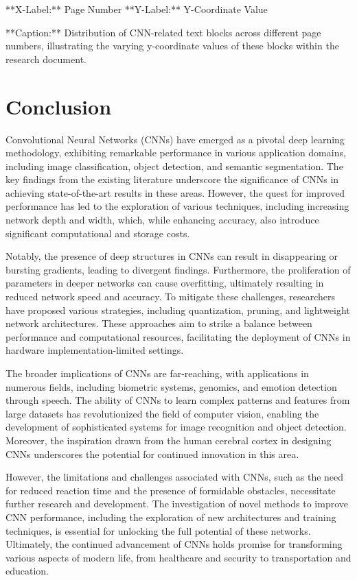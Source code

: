\documentclass[a4paper,twocolumn]{article}%
\begin{document}
**X-Label:** Page Number
**Y-Label:** Y-Coordinate Value

**Caption:** Distribution of CNN-related text blocks across different page numbers, illustrating the varying y-coordinate values of these blocks within the research document.

%
\section*{Conclusion}%
\label{sec:Conclusion}%
Convolutional Neural Networks (CNNs) have emerged as a pivotal deep learning methodology, exhibiting remarkable performance in various application domains, including image classification, object detection, and semantic segmentation. The key findings from the existing literature underscore the significance of CNNs in achieving state-of-the-art results in these areas. However, the quest for improved performance has led to the exploration of various techniques, including increasing network depth and width, which, while enhancing accuracy, also introduce significant computational and storage costs.

Notably, the presence of deep structures in CNNs can result in disappearing or bursting gradients, leading to divergent findings. Furthermore, the proliferation of parameters in deeper networks can cause overfitting, ultimately resulting in reduced network speed and accuracy. To mitigate these challenges, researchers have proposed various strategies, including quantization, pruning, and lightweight network architectures. These approaches aim to strike a balance between performance and computational resources, facilitating the deployment of CNNs in hardware implementation-limited settings.

The broader implications of CNNs are far-reaching, with applications in numerous fields, including biometric systems, genomics, and emotion detection through speech. The ability of CNNs to learn complex patterns and features from large datasets has revolutionized the field of computer vision, enabling the development of sophisticated systems for image recognition and object detection. Moreover, the inspiration drawn from the human cerebral cortex in designing CNNs underscores the potential for continued innovation in this area.

However, the limitations and challenges associated with CNNs, such as the need for reduced reaction time and the presence of formidable obstacles, necessitate further research and development. The investigation of novel methods to improve CNN performance, including the exploration of new architectures and training techniques, is essential for unlocking the full potential of these networks. Ultimately, the continued advancement of CNNs holds promise for transforming various aspects of modern life, from healthcare and security to transportation and education.
\end{document}
